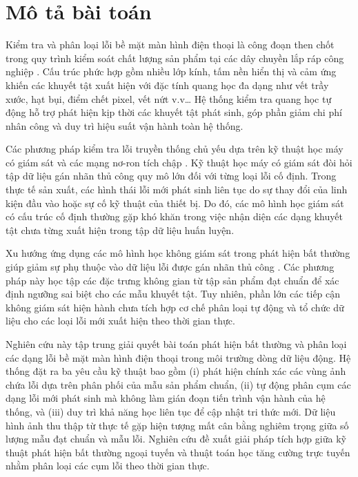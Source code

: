 \section{Mô tả bài toán}

Kiểm tra và phân loại lỗi bề mặt màn hình điện thoại là công đoạn then chốt trong quy trình kiểm soát chất lượng sản phẩm tại các dây chuyền lắp ráp công nghiệp \cite{park2023design}. Cấu trúc phức hợp gồm nhiều lớp kính, tấm nền hiển thị và cảm ứng khiến các khuyết tật xuất hiện với đặc tính quang học đa dạng như vết trầy xước, hạt bụi, điểm chết pixel, vết nứt v.v… Hệ thống kiểm tra quang học tự động hỗ trợ phát hiện kịp thời các khuyết tật phát sinh, góp phần giảm chi phí nhân công và duy trì hiệu suất vận hành toàn hệ thống.

Các phương pháp kiểm tra lỗi truyền thống chủ yếu dựa trên kỹ thuật học máy có giám sát và các mạng nơ-ron tích chập \cite{nguyen2017novel, li2020deep, yolo2023mobile}. Kỹ thuật học máy có giám sát đòi hỏi tập dữ liệu gán nhãn thủ công quy mô lớn đối với từng loại lỗi cố định. Trong thực tế sản xuất, các hình thái lỗi mới phát sinh liên tục do sự thay đổi của linh kiện đầu vào hoặc sự cố kỹ thuật của thiết bị. Do đó, các mô hình học giám sát có cấu trúc cố định thường gặp khó khăn trong việc nhận diện các dạng khuyết tật chưa từng xuất hiện trong tập dữ liệu huấn luyện.

Xu hướng ứng dụng các mô hình học không giám sát trong phát hiện bất thường giúp giảm sự phụ thuộc vào dữ liệu lỗi được gán nhãn thủ công \cite{liu2024effnet, roth2022smartphone}. Các phương pháp này học tập các đặc trưng không gian từ tập sản phẩm đạt chuẩn để xác định ngưỡng sai biệt cho các mẫu khuyết tật. Tuy nhiên, phần lớn các tiếp cận không giám sát hiện hành chưa tích hợp cơ chế phân loại tự động và tổ chức dữ liệu cho các loại lỗi mới xuất hiện theo thời gian thực.

Nghiên cứu này tập trung giải quyết bài toán phát hiện bất thường và phân loại các dạng lỗi bề mặt màn hình điện thoại trong môi trường dòng dữ liệu động. Hệ thống đặt ra ba yêu cầu kỹ thuật bao gồm (i) phát hiện chính xác các vùng ảnh chứa lỗi dựa trên phân phối của mẫu sản phẩm chuẩn, (ii) tự động phân cụm các dạng lỗi mới phát sinh mà không làm gián đoạn tiến trình vận hành của hệ thống, và (iii) duy trì khả năng học liên tục để cập nhật tri thức mới. Dữ liệu hình ảnh thu thập từ thực tế gặp hiện tượng mất cân bằng nghiêm trọng giữa số lượng mẫu đạt chuẩn và mẫu lỗi. Nghiên cứu đề xuất giải pháp tích hợp giữa kỹ thuật phát hiện bất thường ngoại tuyến và thuật toán học tăng cường trực tuyến nhằm phân loại các cụm lỗi theo thời gian thực.

